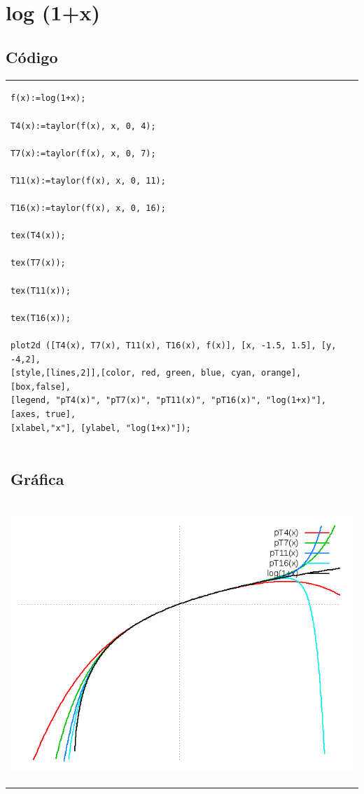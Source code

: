 \documentclass[10pt]{article}
\begin{document}
\section{log (1+x)}



\subsection{Código}
\begin{tabular}{l}
\begin{verbatim}  
f(x):=log(1+x);

T4(x):=taylor(f(x), x, 0, 4);

T7(x):=taylor(f(x), x, 0, 7);

T11(x):=taylor(f(x), x, 0, 11);

T16(x):=taylor(f(x), x, 0, 16);

tex(T4(x));

tex(T7(x));

tex(T11(x));

tex(T16(x));

plot2d ([T4(x), T7(x), T11(x), T16(x), f(x)], [x, -1.5, 1.5], [y, -4,2],
[style,[lines,2]],[color, red, green, blue, cyan, orange],[box,false],
[legend, "pT4(x)", "pT7(x)", "pT11(x)", "pT16(x)", "log(1+x)"],[axes, true],
[xlabel,"x"], [ylabel, "log(1+x)"]);

\end{verbatim} \\
\subsection{Gráfica}\\
\begin{center}
  
    \includegraphics[scale=0.4]{log1}
\end{center}
\end{tabular}
\end{document}
